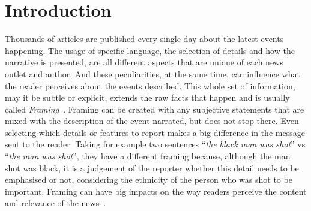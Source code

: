 \chapter{Introduction}


Thousands of articles are published every single day about the latest events happening.
The usage of specific language, the selection of details and how the narrative is presented, are all different aspects that are unique of each news outlet and author.
And these peculiarities, at the same time, can influence what the reader perceives about the events described.
This whole set of information, may it be subtle or explicit, extends the raw facts that happen and is usually called \emph{Framing}~\cite{gamson1989media,scheufele1999framing}.
Framing can be created with any subjective statements that are mixed with the description of the event narrated, but does not stop there.
Even selecting which details or features to report makes a big difference in the message sent to the reader.
Taking for example two sentences ``\textit{the black man was shot}'' vs ``\textit{the man was shot}'', they have a different framing because, although the man shot was black, it is a judgement of the reporter whether this detail needs to be emphasised or not, considering the ethnicity of the person who was shot to be important. %
Framing can have big impacts on the way readers perceive the content and relevance of the news~\cite{cohen2015press}. %



